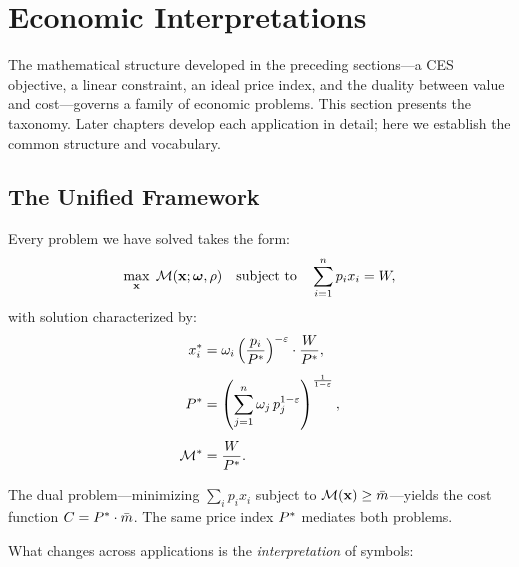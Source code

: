 
\section{Economic Interpretations}
\label{sec:interpretations}

The mathematical structure developed in the preceding sections---a CES objective, a linear constraint, an ideal price index, and the duality between value and cost---governs a family of economic problems. This section presents the taxonomy. Later chapters develop each application in detail; here we establish the common structure and vocabulary.

\subsection{The Unified Framework}
\label{subsec:unified-framework}

Every problem we have solved takes the form:
\begin{equation}
\max_{\mathbf{x}} \; \mathcal{M}(\mathbf{x}; \boldsymbol{\omega}, \rho) \quad \text{subject to} \quad \sum_{i=1}^{n} p_i x_i = W,
\end{equation}
with solution characterized by:
\begin{align}
x_i^{*} &= \omega_i \left( \frac{p_i}{P^{*}} \right)^{-\varepsilon} \cdot \frac{W}{P^{*}}, \\[4pt]
P^{*} &= \left( \sum_{j=1}^{n} \omega_j \, p_j^{1-\varepsilon} \right)^{\frac{1}{1-\varepsilon}}, \\[4pt]
\mathcal{M}^{*} &= \frac{W}{P^{*}}.
\end{align}

The dual problem---minimizing $\sum_i p_i x_i$ subject to $\mathcal{M}(\mathbf{x}) \geq \bar{m}$---yields the cost function $C = P^{*} \cdot \bar{m}$. The same price index $P^{*}$ mediates both problems.

What changes across applications is the \emph{interpretation} of symbols:

